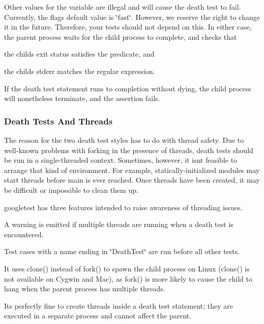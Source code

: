 Other values for the variable are illegal and will cause the death test to fail. Currently, the flag\textquotesingle{}s default value is \char`\"{}fast\char`\"{}. However, we reserve the right to change it in the future. Therefore, your tests should not depend on this. In either case, the parent process waits for the child process to complete, and checks that


\begin{DoxyEnumerate}
\item the child\textquotesingle{}s exit status satisfies the predicate, and
\item the child\textquotesingle{}s stderr matches the regular expression.
\end{DoxyEnumerate}

If the death test statement runs to completion without dying, the child process will nonetheless terminate, and the assertion fails.

\subsubsection*{Death Tests And Threads}

The reason for the two death test styles has to do with thread safety. Due to well-\/known problems with forking in the presence of threads, death tests should be run in a single-\/threaded context. Sometimes, however, it isn\textquotesingle{}t feasible to arrange that kind of environment. For example, statically-\/initialized modules may start threads before main is ever reached. Once threads have been created, it may be difficult or impossible to clean them up.

googletest has three features intended to raise awareness of threading issues.


\begin{DoxyEnumerate}
\item A warning is emitted if multiple threads are running when a death test is encountered.
\item Test cases with a name ending in \char`\"{}\+Death\+Test\char`\"{} are run before all other tests.
\item It uses {\ttfamily clone()} instead of {\ttfamily fork()} to spawn the child process on Linux ({\ttfamily clone()} is not available on Cygwin and Mac), as {\ttfamily fork()} is more likely to cause the child to hang when the parent process has multiple threads.
\end{DoxyEnumerate}

It\textquotesingle{}s perfectly fine to create threads inside a death test statement; they are executed in a separate process and cannot affect the parent.


